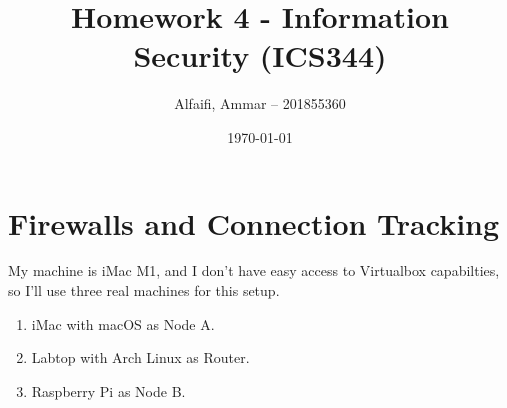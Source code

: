 \documentclass{article}
\title{Homework 4 - Information Security (ICS344)}
\author{Alfaifi, Ammar -- 201855360}
\date{\today}
\begin{document}
\maketitle

\section{Firewalls and Connection Tracking} %
\label{sec:Firewalls and Connection Tracking}
My machine is iMac M1, and I don't have easy access to Virtualbox capabilties, so I'll use three real machines for this setup.
\begin{enumerate}
	\item iMac with macOS as Node A.
	\item Labtop with Arch Linux as Router.
	\item Raspberry Pi as Node B.
\end{enumerate}
\end{document}
